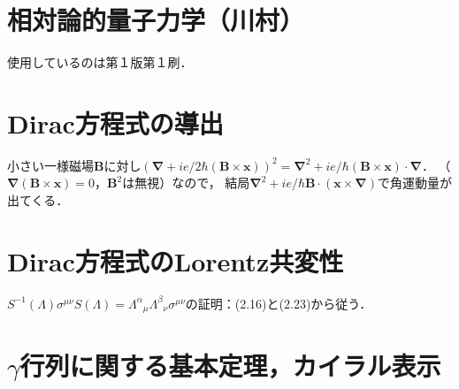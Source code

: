 \chapter*{相対論的量子力学（川村）}
使用しているのは第１版第１刷．
\chapter{Dirac方程式の導出}
小さい一様磁場$\boldsymbol{B}$に対し$(\boldsymbol{\nabla} + ie/2\hbar(\boldsymbol{B}\times\boldsymbol{x}))^2=\boldsymbol{\nabla}^2 + ie/\hbar(\boldsymbol{B}\times\boldsymbol{x})\cdot\boldsymbol{\nabla}$．
（$\boldsymbol{\nabla}(\boldsymbol{B}\times\boldsymbol{x})=0$，$\boldsymbol{B}^2$は無視）なので，
結局$\boldsymbol{\nabla}^2 + ie/\hbar\boldsymbol{B}\cdot(\boldsymbol{x}\times\boldsymbol{\nabla})$で角運動量が出てくる．

\chapter{Dirac方程式のLorentz共変性}
$S^{ - 1}(\Lambda)\sigma^{\mu\nu}S(\Lambda)=\Lambda^\alpha{}_\mu\Lambda^\beta{}_\nu\sigma^{\mu\nu}$の証明：(2.16)と(2.23)から従う．

\chapter{$\gamma$行列に関する基本定理，カイラル表示}

